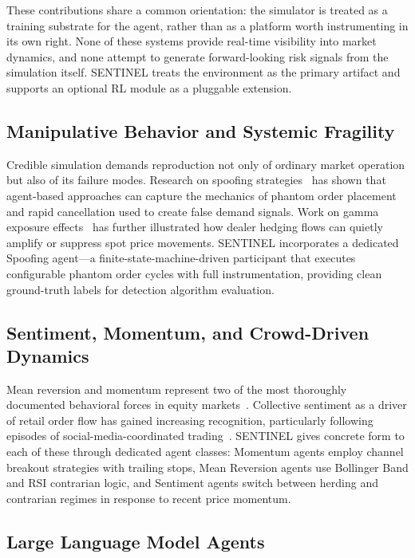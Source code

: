 \documentclass[conference]{IEEEtran}
\begin{document}
These contributions share a common orientation: the simulator is
treated as a training substrate for the agent, rather than as a
platform worth instrumenting in its own right. None of these systems
provide real-time visibility into market dynamics, and none attempt to
generate forward-looking risk signals from the simulation itself.
SENTINEL treats the environment as the primary artifact and supports
an optional RL module as a pluggable extension.

\subsection{Manipulative Behavior and Systemic Fragility}

Credible simulation demands reproduction not only of ordinary market
operation but also of its failure modes. Research on spoofing
strategies~\cite{ref10} has shown that agent-based approaches can
capture the mechanics of phantom order placement and rapid
cancellation used to create false demand signals. Work on gamma
exposure effects~\cite{ref1} has further illustrated how dealer
hedging flows can quietly amplify or suppress spot price movements.
SENTINEL incorporates a dedicated Spoofing agent---a
finite-state-machine-driven participant that executes configurable
phantom order cycles with full instrumentation, providing clean
ground-truth labels for detection algorithm evaluation.

\subsection{Sentiment, Momentum, and Crowd-Driven Dynamics}

Mean reversion and momentum represent two of the most thoroughly
documented behavioral forces in equity markets~\cite{ref12}\cite{ref13}.
Collective sentiment as a driver of retail order flow has gained
increasing recognition, particularly following episodes of
social-media-coordinated trading~\cite{ref14}\cite{ref15}. SENTINEL
gives concrete form to each of these through dedicated agent
classes: Momentum agents employ channel breakout strategies with
trailing stops, Mean Reversion agents use Bollinger Band and RSI
contrarian logic, and Sentiment agents switch between herding and
contrarian regimes in response to recent price momentum.

\subsection{Large Language Model Agents}
\end{document}
